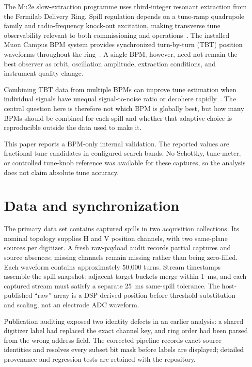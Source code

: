 \documentclass[]{jacow}
\begin{document}
The Mu2e slow-extraction programme uses third-integer resonant extraction from the Fermilab Delivery Ring. Spill regulation depends on a tune-ramp quadrupole family and radio-frequency knock-out excitation, making transverse tune observability relevant to both commissioning and operations~\cite{ibrahim:ibic2019-mopp033,nagaslaev:prab2019,nagaslaev:commissioning2026}. The installed Muon Campus BPM system provides synchronized turn-by-turn (TBT) position waveforms throughout the ring~\cite{patel:ibic2019-wepp044}. A single BPM, however, need not remain the best observer as orbit, oscillation amplitude, extraction conditions, and instrument quality change.

Combining TBT data from multiple BPMs can improve tune estimation when individual signals have unequal signal-to-noise ratio or decohere rapidly~\cite{zisopoulos:ipac2017-mopab122,alexahin:ipac2010-mope084}. The central question here is therefore not which BPM is globally best, but how many BPMs should be combined for each spill and whether that adaptive choice is reproducible outside the data used to make it.

This paper reports a BPM-only internal validation. The reported values are fractional tune candidates in configured search bands. No Schottky, tune-meter, or controlled tune-knob reference was available for these captures, so the analysis does not claim absolute tune accuracy.

\section{Data and synchronization}

The primary data set contains \PrimarySpillCount{} captured spills in two acquisition collections. Its nominal topology supplies \PrimaryNominalHChannels{} H and \PrimaryNominalVChannels{} V position channels, with two same-plane sources per digitizer. A fresh raw-payload audit records \PrimaryPartialCaptures{} partial captures and \PrimarySourceAbsences{} source absences; missing channels remain missing rather than being zero-filled. Each waveform contains approximately 50,000 turns. Stream timestamps assemble the spill snapshot: adjacent target buckets merge within \qty{1}{ms}, and each captured stream must satisfy a separate \qty{25}{ms} same-spill tolerance. The host-published ``raw'' array is a DSP-derived position before threshold substitution and scaling, not an electrode ADC waveform.

Publication auditing exposed two identity defects in an earlier analysis: a shared digitizer label had replaced the exact channel key, and ring order had been parsed from the wrong address field. The corrected pipeline records exact source identities and resolves every subset bit mask before labels are displayed; detailed provenance and regression tests are retained with the repository.
\end{document}
